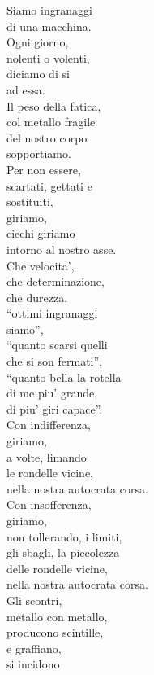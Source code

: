 \begin{haiku}
Siamo ingranaggi\\
di una macchina.\\
Ogni giorno,\\
nolenti o volenti,\\
diciamo di si\\
ad essa.\\
Il peso della fatica,\\
col metallo fragile\\
del nostro corpo\\
sopportiamo.\\
Per non essere,\\
scartati, gettati e\\
sostituiti,\\
giriamo,\\
ciechi giriamo\\
intorno al nostro asse.\\
Che velocita',\\
che determinazione,\\
che durezza,\\
``ottimi ingranaggi\\
siamo'',\\
``quanto scarsi quelli\\
che si son fermati'',\\
``quanto bella la rotella\\
di me piu' grande,\\
di piu' giri capace''.\\
Con indifferenza,\\
giriamo,\\
a volte, limando \\
le rondelle vicine,\\
nella nostra autocrata corsa.\\
Con insofferenza,\\
giriamo,\\
non tollerando, i limiti,\\
gli sbagli, la piccolezza\\
delle rondelle vicine,\\
nella nostra autocrata corsa.\\
Gli scontri,\\
metallo con metallo,\\
producono scintille,\\
e graffiano, \\
si incidono\\

\end{haiku}
